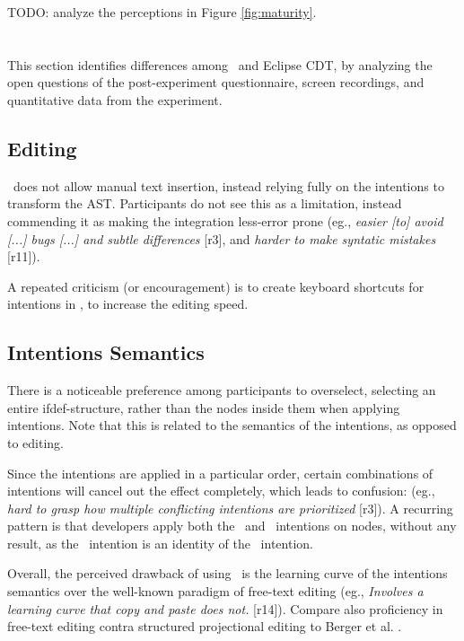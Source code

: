 TODO: analyze the perceptions in Figure \ref{fig:maturity}.


\section{\RQC}
This section identifies differences among \tooln~and Eclipse CDT, by analyzing the open questions of the post-experiment questionnaire, screen recordings, and quantitative data from the experiment. 

\subsection{Editing}
\tooln~does not allow manual text insertion, instead relying fully on the intentions to transform the AST. Participants do not see this as a limitation, instead commending it as making the integration less-error prone (eg., \textit{\bc easier [to] avoid [...] bugs [...] and subtle differences\ec} [r3], and \textit{\bc harder to make syntatic mistakes\ec} [r11]).

A repeated criticism (or encouragement) is to create keyboard shortcuts for intentions in \tooln, to increase the editing speed.


\subsection{Intentions Semantics}
There is a noticeable preference among participants to overselect, selecting an entire ifdef-structure, rather than the nodes inside them when applying intentions. Note that this is related to the semantics of the intentions, as opposed to editing.

Since the intentions are applied in a particular order, certain combinations of intentions will cancel out the effect completely, which leads to confusion: (eg., \textit{\bc hard to grasp how multiple conflicting intentions are prioritized\ec} [r3]). A recurring pattern is that developers apply both the \keep~and \keepasf~intentions on nodes, without any result, as the \keep~intention is an identity of the \keepasf~intention.

Overall, the perceived drawback of using \tooln~is the learning curve of the intentions semantics over the well-known paradigm of free-text editing (eg., \textit{\bc Involves a learning curve that copy and paste does not.\ec} [r14]). Compare also proficiency in free-text editing contra structured projectional editing to Berger et al. \cite{berger2016mps}.

